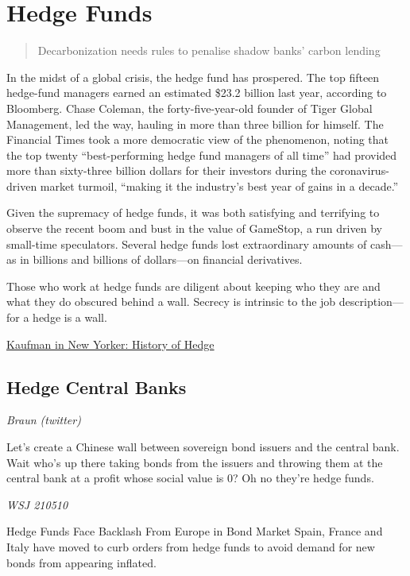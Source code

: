 \documentclass[
]{book}
\begin{document}
\hypertarget{hedge-funds-1}{%
\chapter{Hedge Funds}\label{hedge-funds-1}}

\begin{quote}
Decarbonization needs rules to penalise shadow banks' carbon lending
\end{quote}

In the midst of a global crisis, the hedge fund has prospered. The top fifteen hedge-fund managers earned an estimated \$23.2 billion last year, according to Bloomberg. Chase Coleman, the forty-five-year-old founder of Tiger Global Management, led the way, hauling in more than three billion for himself. The Financial Times took a more democratic view of the phenomenon, noting that the top twenty ``best-performing hedge fund managers of all time'' had provided more than sixty-three billion dollars for their investors during the coronavirus-driven market turmoil, ``making it the industry's best year of gains in a decade.''

Given the supremacy of hedge funds, it was both satisfying and terrifying to observe the recent boom and bust in the value of GameStop, a run driven by small-time speculators. Several hedge funds lost extraordinary amounts of cash---as in billions and billions of dollars---on financial derivatives.

Those who work at hedge funds are diligent about keeping who they are and what they do obscured behind a wall. Secrecy is intrinsic to the job description---for a hedge is a wall.

\href{https://www.newyorker.com/culture/culture-desk/a-brief-history-of-the-hedge-fund}{Kaufman in New Yorker: History of Hedge}

\hypertarget{hedge-central-banks}{%
\section{Hedge Central Banks}\label{hedge-central-banks}}

\emph{Braun (twitter)}

Let's create a Chinese wall between sovereign bond issuers and the central bank.
Wait who's up there taking bonds from the issuers and throwing them at the central bank at a profit whose social value is 0? Oh no they're hedge funds.

\emph{WSJ 210510}

Hedge Funds Face Backlash From Europe in Bond Market
Spain, France and Italy have moved to curb orders from hedge funds
to avoid demand for new bonds from appearing inflated.
\end{document}
